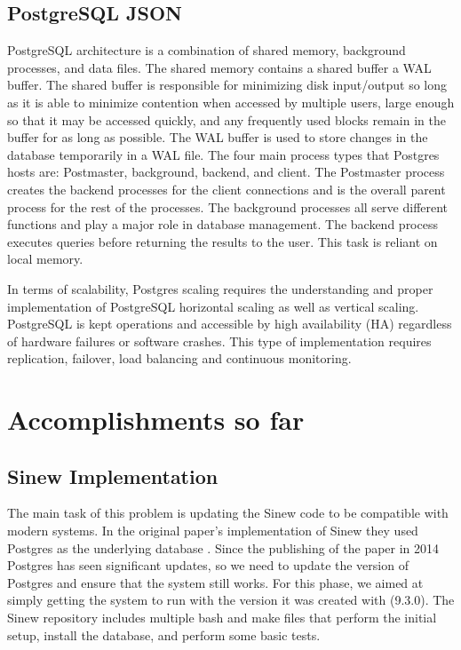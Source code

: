 \documentclass[sigconf]{acmart}
\begin{document}
   \subsection{PostgreSQL JSON}
    PostgreSQL architecture \cite{PostgresMedium} is a combination of shared memory, background processes, and data files. The shared memory contains a shared buffer a WAL buffer. The shared buffer is responsible for minimizing disk input/output so long as it is able to minimize contention when accessed by multiple users, large enough so that it may be accessed quickly, and any frequently used blocks remain in the buffer for as long as possible. The WAL buffer is used to store changes in the database temporarily in a WAL file. The four main process types that Postgres hosts are: Postmaster, background, backend, and client. The Postmaster process creates the backend processes for the client connections and is the overall parent process for the rest of the processes. The background processes all serve different functions and play a major role in database management. The backend process executes queries before returning the results to the user. This task is reliant on local memory.

    In terms of scalability, Postgres scaling\cite{Postgres-scalable} requires the understanding and proper implementation of PostgreSQL horizontal scaling as well as vertical scaling. PostgreSQL is kept operations and accessible by high availability (HA) regardless of hardware failures or software crashes. This type of implementation requires replication, failover, load balancing and continuous monitoring.

\section{Accomplishments so far}
    \subsection{Sinew Implementation}
    The main task of this problem is updating the Sinew code to be compatible with modern systems. In the original paper's implementation of Sinew they used Postgres as the underlying database \cite{Tahara_Diamond_Abadi_2014}. Since the publishing of the paper in 2014 Postgres has seen significant updates, so we need to update the version of Postgres and ensure that the system still works. For this phase, we aimed at simply getting the system to run with the version it was created with (9.3.0). The Sinew repository includes multiple bash and make files that perform the initial setup, install the database, and perform some basic tests.
\end{document}
